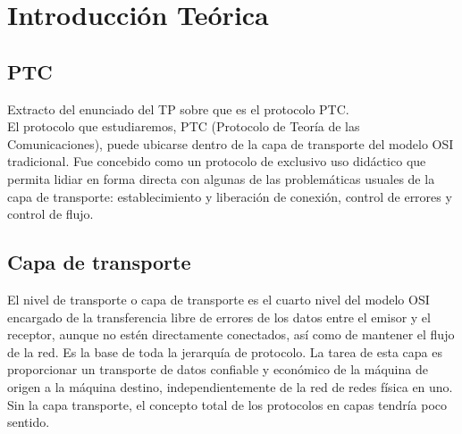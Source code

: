 \newpage
\section{Introducción Teórica}
\subsection{PTC} 
\indent Extracto del enunciado del TP sobre que es el protocolo PTC.\\
\indent El protocolo que estudiaremos, PTC (Protocolo de Teoría de las
Comunicaciones), puede ubicarse dentro de la capa de transporte del modelo OSI
tradicional. Fue concebido como un protocolo de exclusivo uso didáctico que
permita lidiar en forma directa con algunas de las problemáticas usuales de la
capa de transporte: establecimiento y liberación de conexión, control de errores
y control de flujo.

\subsection{Capa de transporte}
\indent El nivel de transporte o capa de transporte es el cuarto nivel del
modelo OSI encargado de la transferencia libre de errores de los datos entre el
emisor y el receptor, aunque no estén directamente conectados, así como de
mantener el flujo de la red. Es la base de toda la jerarquía de protocolo. La
tarea de esta capa es proporcionar un transporte de datos confiable y económico
de la máquina de origen a la máquina destino, independientemente de la red de
redes física en uno. Sin la capa transporte, el concepto total de los protocolos
en capas tendría poco sentido.